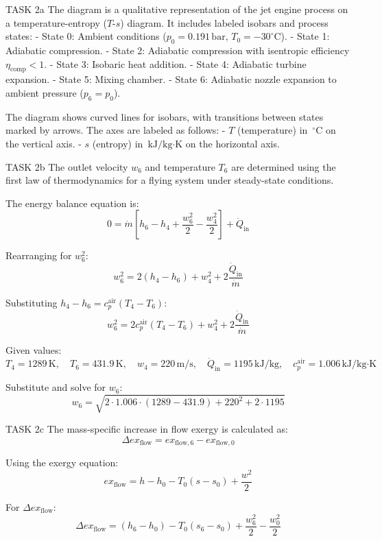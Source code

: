 TASK 2a  
The diagram is a qualitative representation of the jet engine process on a temperature-entropy (\( T \)-\( s \)) diagram. It includes labeled isobars and process states:  
- State 0: Ambient conditions (\( p_0 = 0.191 \, \text{bar} \), \( T_0 = -30^\circ\text{C} \)).  
- State 1: Adiabatic compression.  
- State 2: Adiabatic compression with isentropic efficiency \( \eta_{\text{comp}} < 1 \).  
- State 3: Isobaric heat addition.  
- State 4: Adiabatic turbine expansion.  
- State 5: Mixing chamber.  
- State 6: Adiabatic nozzle expansion to ambient pressure (\( p_6 = p_0 \)).  

The diagram shows curved lines for isobars, with transitions between states marked by arrows. The axes are labeled as follows:  
- \( T \) (temperature) in \( \, ^\circ\text{C} \) on the vertical axis.  
- \( s \) (entropy) in \( \, \text{kJ/kg·K} \) on the horizontal axis.  

TASK 2b  
The outlet velocity \( w_6 \) and temperature \( T_6 \) are determined using the first law of thermodynamics for a flying system under steady-state conditions.  

The energy balance equation is:  
\[
0 = \dot{m} \left[ h_6 - h_4 + \frac{w_6^2}{2} - \frac{w_4^2}{2} \right] + \dot{Q}_{\text{in}}
\]  

Rearranging for \( w_6^2 \):  
\[
w_6^2 = 2 \left( h_4 - h_6 \right) + w_4^2 + 2 \frac{\dot{Q}_{\text{in}}}{\dot{m}}
\]  

Substituting \( h_4 - h_6 = c_p^{\text{air}} \left( T_4 - T_6 \right) \):  
\[
w_6^2 = 2 c_p^{\text{air}} \left( T_4 - T_6 \right) + w_4^2 + 2 \frac{\dot{Q}_{\text{in}}}{\dot{m}}
\]  

Given values:  
\[
T_4 = 1289 \, \text{K}, \quad T_6 = 431.9 \, \text{K}, \quad w_4 = 220 \, \text{m/s}, \quad \dot{Q}_{\text{in}} = 1195 \, \text{kJ/kg}, \quad c_p^{\text{air}} = 1.006 \, \text{kJ/kg·K}
\]  

Substitute and solve for \( w_6 \):  
\[
w_6 = \sqrt{2 \cdot 1.006 \cdot (1289 - 431.9) + 220^2 + 2 \cdot 1195}
\]  

TASK 2c  
The mass-specific increase in flow exergy is calculated as:  
\[
\Delta ex_{\text{flow}} = ex_{\text{flow},6} - ex_{\text{flow},0}
\]  

Using the exergy equation:  
\[
ex_{\text{flow}} = h - h_0 - T_0 (s - s_0) + \frac{w^2}{2}
\]  

For \( \Delta ex_{\text{flow}} \):  
\[
\Delta ex_{\text{flow}} = (h_6 - h_0) - T_0 (s_6 - s_0) + \frac{w_6^2}{2} - \frac{w_0^2}{2}
\]  

